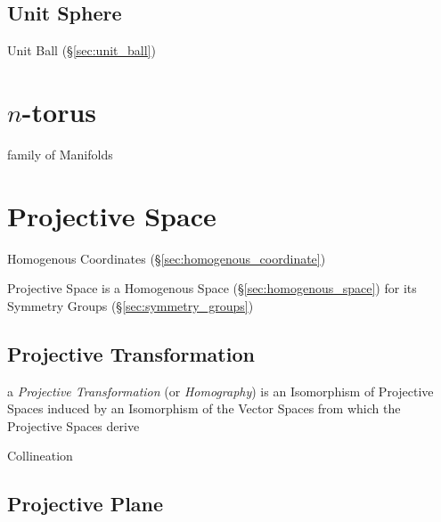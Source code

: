 \subsection{Unit Sphere}\label{sec:unit_sphere}

Unit Ball (\S\ref{sec:unit_ball})



\section{$n$-torus}\label{sec:n_torus}

family of Manifolds



\section{Projective Space}\label{sec:projective_space}

Homogenous Coordinates (\S\ref{sec:homogenous_coordinate})

Projective Space is a Homogenous Space (\S\ref{sec:homogenous_space}) for its
Symmetry Groups (\S\ref{sec:symmetry_groups})



\subsection{Projective Transformation}
\label{sec:projective_transformation}

a \emph{Projective Transformation} (or \emph{Homography}) is an
Isomorphism of Projective Spaces induced by an Isomorphism of the
Vector Spaces from which the Projective Spaces derive

Collineation



\subsection{Projective Plane}\label{sec:projective_plane}

